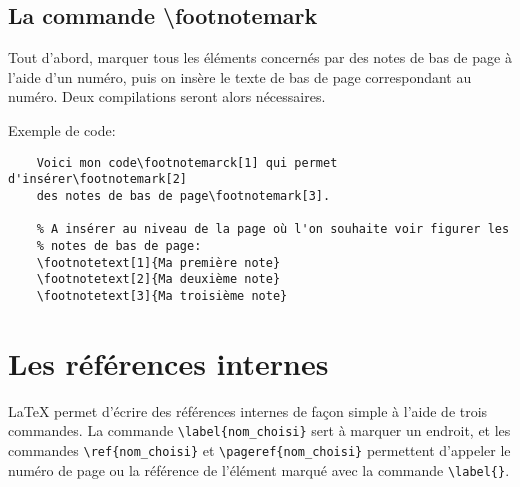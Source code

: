 \subsection*{La commande \textbackslash footnotemark}
Tout d'abord, marquer tous les éléments concernés par des notes de bas de page à l'aide d'un numéro, puis on insère le texte de bas de page correspondant au numéro. Deux compilations seront alors nécessaires.
\medskip

Exemple de code:
\begin{verbatim}
    Voici mon code\footnotemarck[1] qui permet d'insérer\footnotemark[2] 
    des notes de bas de page\footnotemark[3].
    
    % A insérer au niveau de la page où l'on souhaite voir figurer les 
    % notes de bas de page:
    \footnotetext[1]{Ma première note}
    \footnotetext[2]{Ma deuxième note}
    \footnotetext[3]{Ma troisième note}
\end{verbatim}
\medskip

\section{Les références internes}
\LaTeX{} permet d'écrire des références internes de façon simple à l'aide de trois commandes. La commande \verb|\label{nom_choisi}| sert à marquer un endroit, et les commandes \verb|\ref{nom_choisi}| et \verb|\pageref{nom_choisi}| permettent d'appeler le numéro de page ou la référence de l'élément marqué avec la commande \verb|\label{}|.
\medskip
